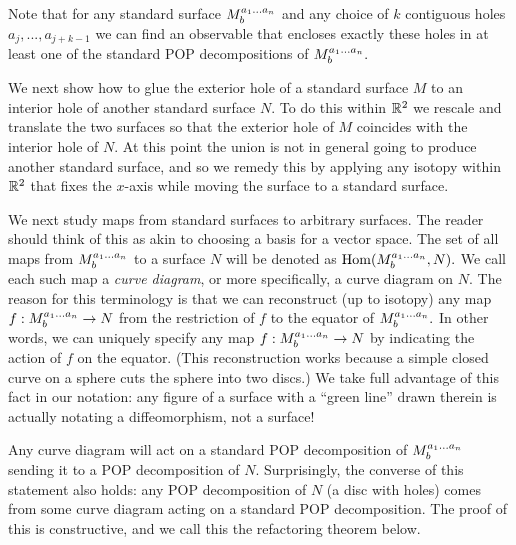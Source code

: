 \documentclass[aps, tightenlines, letterpaper, onecolumn, superscriptaddress, notitlepage, 11pt, groupedaddress]{revtex4-1}
\begin{document}
Note that for any standard surface $M^{a_1...a_n}_{b}$ 
and any choice of $k$ contiguous holes $a_j,...,a_{j+k-1}$
we can find an observable that encloses exactly these holes
in at least one of the standard POP decompositions of $M^{a_1...a_n}_{b}.$ 

We next show how to glue the exterior hole of
a standard surface $M$
to an interior hole of another standard surface $N.$
To do this within $\mathbb{R}^2$ we rescale and translate the two surfaces so
that the exterior hole of $M$ coincides with the interior hole of $N.$
At this point the union is not in general going to
produce another standard surface,
and so we remedy this by applying any isotopy within $\mathbb{R}^2$
that fixes the $x$-axis while moving the surface to a standard surface.

We next study maps from standard surfaces to arbitrary surfaces.
The reader should think of this as akin to choosing a basis
for a vector space.
The set of all maps from $M^{a_1...a_n}_{b}$ 
to a surface $N$ will be denoted as ${\mathrm{Hom}}(M^{a_1...a_n}_{b}, N).$ 
We call each such map a \emph{curve diagram},
or more specifically, a curve diagram on $N$.
The reason for this terminology is that we can reconstruct (up to isotopy)
any map $f:M^{a_1...a_n}_{b}\to N$ from
the restriction of $f$ to the equator of $M^{a_1...a_n}_{b}.$
In other words, we can uniquely specify any map
$f:M^{a_1...a_n}_{b}\to N$ by indicating the action of
$f$ on the equator.
(This reconstruction works because a simple closed curve on a sphere cuts 
the sphere into two discs.)
We take full advantage of this
fact in our notation: any figure of a surface
with a ``green line'' drawn therein is actually notating a 
diffeomorphism, not a surface!

Any curve diagram will act on a standard POP decomposition
of $M^{a_1...a_n}_{b}$ sending it to a POP decomposition of $N.$
Surprisingly, the converse of this statement also holds:
any POP decomposition of $N$ (a disc with holes)
comes from some curve diagram
acting on a standard POP decomposition.
The proof of this is constructive, and we call this
the refactoring theorem below. %
\end{document}
